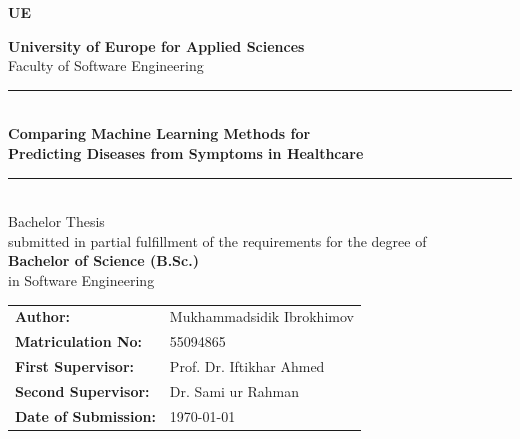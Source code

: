 \begin{titlepage}
    \noindent
    \begin{minipage}{\textwidth}
        \colorbox{UERed}{%
            \begin{minipage}{\dimexpr\textwidth-2\fboxsep}
                \vspace{0.5cm}
                \centering
                {\color{white}\fontsize{40}{48}\selectfont\textbf{UE}}
                \vspace{0.3cm}
            \end{minipage}%
        }
    \end{minipage}

    \vspace{1.0cm}

    \centering

    {\large\color{UEDoveBlue}\textbf{University of Europe for Applied Sciences}}\\[0.3cm]
    {\large\color{UEGrey}Faculty of Software Engineering}\\[0.5cm]

    {\color{UERed}\rule{0.7\textwidth}{2pt}}\\[1.5cm]

    {\LARGE\bfseries Comparing Machine Learning Methods for\\ Predicting Diseases from Symptoms in Healthcare}\\[1.5cm]

    {\color{UERed}\rule{0.5\textwidth}{1pt}}\\[1cm]

    {\large Bachelor Thesis}\\[0.4cm]
    {\normalsize submitted in partial fulfillment of the requirements for the degree of}\\[0.4cm]
    {\large\bfseries Bachelor of Science (B.Sc.)}\\[0.3cm]
    {\normalsize in Software Engineering}\\[1.5cm]

    \begin{flushleft}
        \hspace{3cm}
        \begin{tabular}{@{}ll}
            \textbf{Author:}             & Mukhammadsidik Ibrokhimov \\[0.3cm]
            \textbf{Matriculation No:}   & 55094865 \\[0.3cm]
            \textbf{First Supervisor:}   & Prof. Dr. Iftikhar Ahmed \\[0.3cm]
            \textbf{Second Supervisor:}  & Dr. Sami ur Rahman \\[0.3cm]
            \textbf{Date of Submission:} & \today \\
        \end{tabular}
    \end{flushleft}


\end{titlepage}
